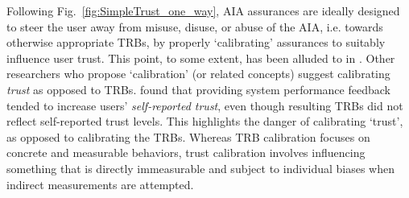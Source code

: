     Following Fig.~\ref{fig:SimpleTrust_one_way}, AIA assurances are ideally designed to steer the user away from misuse, disuse, or abuse of the AIA, i.e. towards otherwise appropriate TRBs, by properly `calibrating' assurances to suitably influence user trust. This point, to some extent, has been alluded to in \cite{Muir1994-ow,Lillard2015-yg,Lee2004-pv,Hutchins2015-if}. Other researchers who propose `calibration' (or related concepts) suggest calibrating \emph{trust} as opposed to TRBs. \citet{Dzindolet2003-ts} found that providing system performance feedback tended to increase users' \textit{self-reported trust}, even though resulting TRBs did not reflect self-reported trust levels. This highlights the danger of calibrating `trust', as opposed to calibrating the TRBs. Whereas TRB calibration focuses on concrete and measurable behaviors, trust calibration involves influencing something that is directly immeasurable and subject to individual biases when indirect measurements are attempted.
